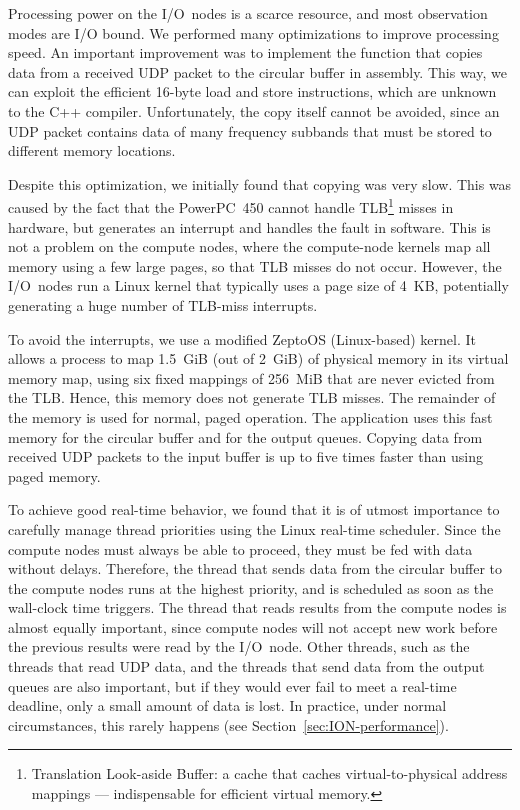 \documentclass[10pt]{article}
\begin{document}
Processing power on the I/O~nodes is a scarce resource, and most observation
modes are I/O bound.
We performed many optimizations to improve processing speed.
An important improvement was to implement the function that copies data from a
received UDP packet to the circular buffer in assembly.
This way, we can exploit the efficient 16-byte load and
store instructions, which are unknown to the C++ compiler.
Unfortunately, the copy itself cannot be avoided, since an UDP packet contains
data of many frequency subbands that must be stored to different memory
locations.

Despite this optimization, we initially found that copying was very slow.
This was caused by the fact that the PowerPC~450 cannot handle
TLB\footnote{Translation Look-aside Buffer: a cache that caches
virtual-to-physical address mappings --- indispensable for efficient virtual
memory.} misses in hardware, but generates an interrupt and handles the fault
in software.
This is not a problem on the compute nodes, where the compute-node kernels 
map all memory using a few large pages, so that TLB misses do not occur.
However, the I/O~nodes run a Linux kernel that typically uses a page size of
4~KB, potentially generating a huge number of TLB-miss interrupts.

To avoid the interrupts, we use a modified ZeptoOS (Linux-based)
kernel\cite{Kazutomo:09}.
It allows a process to map 1.5~GiB (out of 2~GiB) of physical memory in its
virtual memory map, using six fixed mappings of 256~MiB that are never evicted
from the TLB.
Hence, this memory does not generate TLB misses.
The remainder of the memory is used for normal, paged operation.
The application uses this fast memory for the circular buffer and for the
output queues.
Copying data from received UDP packets to the input buffer is up to five times
faster than using paged memory.

To achieve good real-time behavior, we found that it is of utmost importance
to carefully manage thread priorities using the Linux real-time scheduler.
Since the compute nodes must always be able to proceed, they must be fed with
data without delays.
Therefore, the thread that sends data from the circular buffer to the
compute nodes runs at the highest priority, and is scheduled as soon as the
wall-clock time triggers.
The thread that reads results from the compute nodes is almost equally
important, since compute nodes will not accept new work before the previous
results were read by the I/O~node. %
Other threads, such as the threads that read UDP data, and the threads that
send data from the output queues are also important, but if they would ever
fail to meet a real-time deadline, only a small amount of data is lost.
In practice, under normal circumstances, this rarely happens
(see Section~\ref{sec:ION-performance}).
\end{document}
